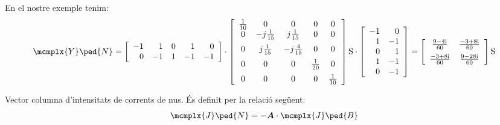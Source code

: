 \begin{list}{}
   En el nostre exemple tenim:
   {\fontsize{10pt}{10pt}\selectfont
   \[
      \mcmplx{Y}\ped{N} =
      \begin{bmatrix}\begin{array}{rrrrr}
      	 -1 & 1  & 0 &  1 & 0 \\  0 & -1 & 1 & -1 & -1
      \end{array}\end{bmatrix} \cdot
      \begin{bmatrix}\begin{array}{ccccc}
            \frac{1}{10} & 0 & 0 & 0 & 0 \\
            0 & -j\frac{1}{15} & j\frac{1}{15} & 0 & 0 \\[2mm]
            0 & j\frac{1}{15} & -j\frac{4}{15} & 0 & 0 \\[2mm]
            0 & 0 & 0 & \frac{1}{20} & 0 \\[2mm]
            0 & 0 & 0 & 0 & \frac{1}{10}
      \end{array}\end{bmatrix}\unit{S} \cdot
      \begin{bmatrix}\begin{array}{rr} 
      	-1 & 0 \\ 1  & -1 \\  0 & 1 \\ 1 & -1 \\ 0 & -1
      \end{array}\end{bmatrix}
       =
      \begin{bmatrix}\begin{array}{cc}
            \frac{\complexnum{9 - j 4}}{60} & \frac{\complexnum{-3 + j 8}}{60} \\[2mm]
            \frac{\complexnum{-3 + j 8}}{60} & \frac{\complexnum{9 - j 28}}{60}
      \end{array}\end{bmatrix}\unit{S}
      \label{eq:yn}
   \]}

   \item[$\mcmplx{J}\ped{N}\{n\}$] Vector columna d'intensitats de corrents de nus. És definit per la relació següent:
   \begin{equation}
      \mcmplx{J}\ped{N} = - \boldsymbol{A} \cdot\mcmplx{J}\ped{B}
   \end{equation}


\end{list}
